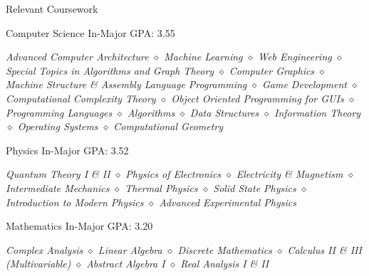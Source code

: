 \documentclass{resume}
\newcommand{\coursep}{\diamond}
\begin{document}
  \begin{rSection}{Relevant Coursework}
    \begin{rSubsection}{Computer Science}
        {In-Major GPA: 3.55}{}{}
        \item\textit{Advanced Computer Architecture $\coursep$ Machine Learning $\coursep$ Web Engineering $\coursep$ Special Topics in Algorithms and Graph Theory $\coursep$ Computer Graphics $\coursep$ Machine Structure \& Assembly Language Programming $\coursep$ Game Development $\coursep$ Computational Complexity Theory $\coursep$ Object Oriented Programming for GUIs $\coursep$ Programming Languages $\coursep$ Algorithms $\coursep$ Data Structures $\coursep$ Information Theory $\coursep$ Operating Systems $\coursep$ Computational Geometry}
    \end{rSubsection}
    \begin{rSubsection}{Physics}
        {In-Major GPA: 3.52}{}{}
        \item\textit{Quantum Theory I \textit{\&} II $\coursep$ Physics of Electronics $\coursep$ Electricity \textit{\&} Magnetism $\coursep$ Intermediate Mechanics $\coursep$ Thermal Physics $\coursep$ Solid State Physics $\coursep$ Introduction to Modern Physics $\coursep$ Advanced Experimental Physics}
    \end{rSubsection}
    \begin{rSubsection}{Mathematics}
        {In-Major GPA: 3.20}{}{}
        \item\textit{Complex Analysis $\coursep$ Linear Algebra $\coursep$ Discrete Mathematics $\coursep$ Calculus II \textit{\&} III (Multivariable) $\coursep$ Abstract Algebra I $\coursep$ Real Analysis I \textit{\&} II} 
    \end{rSubsection}
  \end{rSection}
\end{document}
